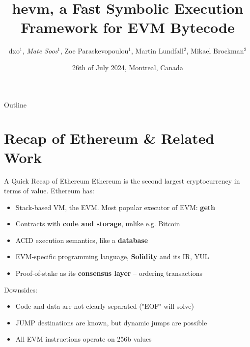 \documentclass[aspectratio=169]{beamer}
\title{hevm, a Fast Symbolic Execution Framework for EVM Bytecode}
\author{dxo$^{1}$, \emph{Mate Soos$^{1}$}, Zoe Paraskevopoulou$^{1}$, Martin Lundfall$^{2}$, Mikael Brockman$^{2}$}
\institute{$^{1}$ Ethereum Foundation, $^{2}$ Independent Researcher}
\date{26th of July 2024, Montreal, Canada}
\begin{document}
\begin{frame}
    \titlepage 
\end{frame}

%

\begin{frame}{Outline}
    \tableofcontents
\end{frame}



\section{Recap of Ethereum \& Related Work}

\begin{frame}{A Quick Recap of Ethereum}
Ethereum is the second largest cryptocurrency in terms of value. Ethereum has:
\begin{itemize}
\item Stack-based VM, the EVM. Most popular executor of EVM: \textbf{geth}
\item Contracts with \textbf{code and storage}, unlike e.g. Bitcoin
\item ACID execution semantics, like a \textbf{database}
\item EVM-specific programming language, \textbf{Solidity} and its IR, YUL
\item Proof-of-stake as its \textbf{consensus layer} -- ordering transactions
\end{itemize}

Downsides:
\begin{itemize}
\item Code and data are not clearly separated ("EOF" will solve)
\item JUMP destinations are known, but dynamic jumps are possible
\item All EVM instructions operate on 256b values
\end{itemize}

\end{frame}
\end{document}
